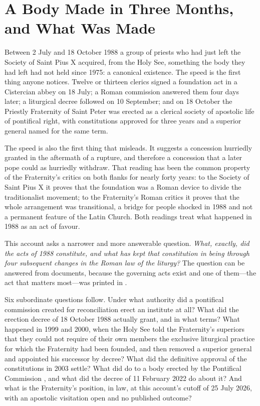 \section{A Body Made in Three Months, and What Was Made}

Between 2 July and 18 October 1988 a group of priests who had just left
the Society of Saint Pius X acquired, from the Holy See, something the
body they had left had not held since 1975: a canonical existence. The
speed is the first thing anyone notices. Twelve or thirteen clerics
signed a foundation act in a Cistercian abbey on 18 July; a Roman
commission answered them four days later; a liturgical decree followed on
10 September; and on 18 October the Priestly Fraternity of Saint Peter
was erected as a clerical society of apostolic life of pontifical right,
with constitutions approved for three years and a superior general named
for the same term.

The speed is also the first thing that misleads. It suggests a
concession hurriedly granted in the aftermath of a rupture, and therefore
a concession that a later pope could as hurriedly withdraw. That reading
has been the common property of the Fraternity's critics on both flanks
for nearly forty years: to the Society of Saint Pius X it proves that the
foundation was a Roman device to divide the traditionalist movement; to
the Fraternity's Roman critics it proves that the whole arrangement was
transitional, a bridge for people shocked in 1988 and not a permanent
feature of the Latin Church. Both readings treat what happened in 1988 as
an act of favour.

This account asks a narrower and more answerable question. \emph{What,
exactly, did the acts of 1988 constitute, and what has kept that
constitution in being through four subsequent changes in the Roman law of
the liturgy?} The question can be answered from documents, because the
governing acts exist and one of them---the act that matters most---was
printed in .

Six subordinate questions follow. Under what authority did a pontifical
commission created for reconciliation erect an institute at all? What did
the erection decree of 18 October 1988 actually grant, and in what terms?
What happened in 1999 and 2000, when the Holy See told the Fraternity's
superiors that they could not require of their own members the exclusive
liturgical practice for which the Fraternity had been founded, and then
removed a superior general and appointed his successor by decree? What
did the definitive approval of the constitutions in 2003 settle? What did
 do to a body erected by the Pontifical
Commission , and what did the decree of 11 February
2022 do about it? And what is the Fraternity's position, in law, at this
account's cutoff of 25 July 2026, with an apostolic visitation open and
no published outcome?

